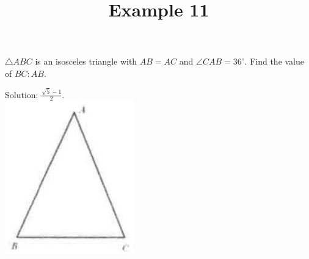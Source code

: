 \documentclass{article}
\title{Example 11}
\date{}
\begin{document}
\maketitle

\(\triangle A B C\) is an isosceles triangle with \(A B=A C\) and \(\angle C A B=36^{\circ}\). Find the value of \(B C: A B\).

Solution: \(\frac{\sqrt{5}-1}{2}\).\\
\centering
\includegraphics[width=\textwidth]{images/problem_image_1.jpg}
\end{document}
